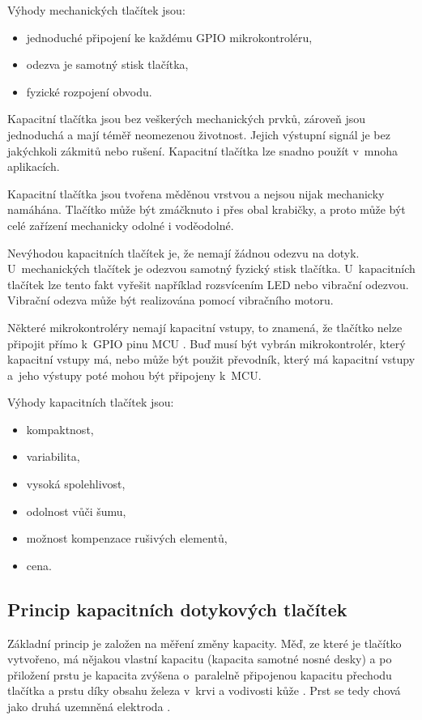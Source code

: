 Výhody mechanických tlačítek jsou:
\begin{itemize}
  \item jednoduché připojení ke každému GPIO mikrokontroléru,
  \item odezva je samotný stisk tlačítka,
  \item fyzické rozpojení obvodu.
\end{itemize}

Kapacitní tlačítka jsou bez veškerých mechanických prvků, zároveň jsou jednoduchá a mají téměř neomezenou 
životnost. Jejich výstupní signál je bez jakýchkoli zákmitů nebo rušení. Kapacitní tlačítka lze snadno použít v~mnoha aplikacích. 

Kapacitní tlačítka jsou tvořena měděnou vrstvou a nejsou nijak mechanicky namáhána. Tlačítko může být zmáčknuto i přes 
obal krabičky, a proto může být celé zařízení mechanicky odolné i voděodolné. 

Nevýhodou kapacitních tlačítek je, že nemají žádnou odezvu na dotyk. U~mechanických tlačítek je odezvou samotný fyzický 
stisk tlačítka. U~kapacitních tlačítek lze tento fakt vyřešit například rozsvícením LED nebo vibrační odezvou. Vibrační 
odezva může být realizována pomocí vibračního motoru. 

Některé mikrokontroléry nemají kapacitní vstupy, to znamená, že tlačítko nelze připojit přímo k~GPIO pinu MCU \cite{ESP_C3_dtsh}. 
Buď musí být vybrán mikrokontrolér, který kapacitní vstupy má, nebo může být použit převodník, který má kapacitní vstupy a~jeho 
výstupy poté mohou být připojeny k~MCU. 

Výhody kapacitních tlačítek jsou:
\begin{itemize}
  \item kompaktnost,
  \item variabilita,
  \item vysoká spolehlivost,
  \item odolnost vůči šumu,
  \item možnost kompenzace rušivých elementů,
  \item cena. 
\end{itemize}

\subsection{Princip kapacitních dotykových tlačítek}
Základní princip je založen na měření změny kapacity. Měď, ze které je tlačítko vytvořeno, má
nějakou vlastní kapacitu (kapacita samotné nosné desky) a po přiložení prstu je kapacita zvýšena o~paralelně 
připojenou kapacitu přechodu tlačítka a prstu díky obsahu železa v~krvi a vodivosti kůže \cite{PrincipKapTl}. 
Prst se tedy chová jako druhá uzemněná elektroda \cite{PrincipKapTl}. 

